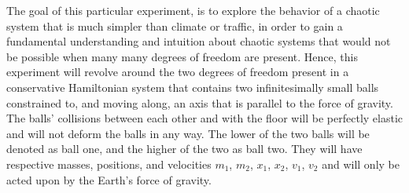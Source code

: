 \documentclass[twocolumn]{article}
\begin{document}
The goal of this particular experiment, is to explore the behavior of a chaotic system that is much simpler than climate or traffic, in order to gain a fundamental understanding and intuition about chaotic systems that would not be possible when many many degrees of freedom are present. Hence, this experiment will revolve around the two degrees of freedom present in a conservative Hamiltonian system that contains two infinitesimally small balls constrained to, and moving along, an axis that is parallel to the force of gravity. The balls' collisions between each other and with the floor will be perfectly elastic and will not deform the balls in any way. The lower of the two balls will be denoted as ball one, and the higher of the two as ball two. They will have respective masses, positions, and velocities $m_1$, $m_2$, $x_1$, $x_2$, $v_1$, $v_2$ and will only be acted upon by the Earth's force of gravity.
\end{document}

